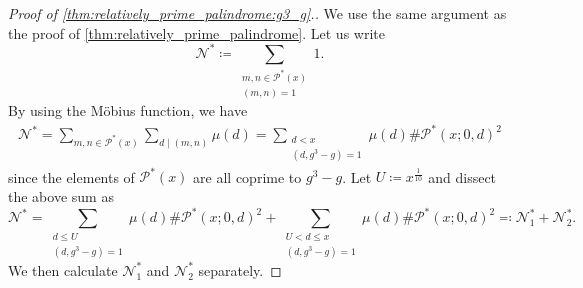 \documentclass{amsart}
\theoremstyle{plain}
\theoremstyle{definition}
\begin{document}
\begin{proof}[Proof of \cref{thm:relatively_prime_palindrome:g3_g}.]
We use the same argument as the proof of \cref{thm:relatively_prime_palindrome}.
Let us write
\[
\mathscr{N}^{\ast}
\coloneqq
\sum_{\substack{
m,n\in\mathscr{P}^{\ast}(x)\\
(m,n)=1
}}
1.
\]
By using the M\"obius function, we have
\begin{align}
\mathscr{N}^{\ast}
=
\sum_{m,n\in\mathscr{P}^{\ast}(x)}
\sum_{d\mid(m,n)}
\mu(d)
=
\sum_{\substack{
d<x\\
(d,g^{3}-g)=1
}}
\mu(d)
\#\mathscr{P}^{\ast}(x;0,d)^{2}
\end{align}
since the elements of $\mathscr{P}^{\ast}(x)$
are all coprime to $g^{3}-g$.
Let $U\coloneqq x^{\frac{1}{10}}$ and dissect the above sum as
\begin{equation}
\label{thm:relatively_prime_palindrome:g3_g:N_N1_N2}
\mathscr{N}^{\ast}
=
\sum_{\substack{
d\le U\\
(d,g^{3}-g)=1
}}
\mu(d)
\#\mathscr{P}^{\ast}(x;0,d)^{2}
+
\sum_{\substack{
U<d\le x\\
(d,g^{3}-g)=1
}}
\mu(d)
\#\mathscr{P}^{\ast}(x;0,d)^{2}
\eqqcolon
\mathscr{N}_{1}^{\ast}+\mathscr{N}_{2}^{\ast}.
\end{equation}
We then calculate $\mathscr{N}_{1}^{\ast}$ and $\mathscr{N}_{2}^{\ast}$ separately.


\end{proof}
\end{document}

